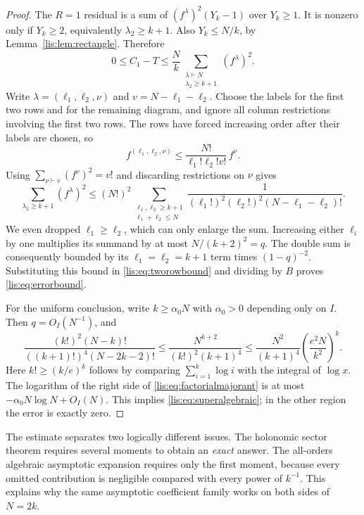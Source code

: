 \documentclass[11pt,letterpaper]{article}
\numberwithin{equation}{section}
\theoremstyle{definition}
\begin{document}
\begin{proof}
The $R=1$ residual is a sum of $(f^\lambda)^2(Y_k-1)$ over $Y_k\ge1$.
It is nonzero only if $Y_k\ge2$, equivalently $\lambda_2\ge k+1$.
Also $Y_k\le N/k$, by Lemma~\ref{lis:lem:rectangle}. Therefore
\begin{equation}
 0\le C_1-T\le\frac Nk
       \sum_{\substack{\lambda\vdash N\\\lambda_2\ge k+1}}
                      (f^\lambda)^2.\label{lis:eq:tworowbound}
\end{equation}
Write $\lambda=(\ell_1,\ell_2,\nu)$ and $v=N-\ell_1-\ell_2$.
Choose the labels for the first two rows and for the remaining diagram,
and ignore all column restrictions involving the first two rows.
The rows have forced increasing order after their labels are chosen,
so
\[
 f^{(\ell_1,\ell_2,\nu)}
 \le \frac{N!}{\ell_1!\ell_2!v!}\,f^\nu.
\]
Using $\sum_{\nu\vdash v}(f^\nu)^2=v!$ and discarding restrictions on
$\nu$ gives
\begin{equation}
 \sum_{\lambda_2\ge k+1}(f^\lambda)^2
 \le (N!)^2\sum_{\substack{\ell_1,\ell_2\ge k+1\\\ell_1+\ell_2\le N}}
        \frac{1}{(\ell_1!)^2(\ell_2!)^2(N-\ell_1-\ell_2)!}.
 \label{lis:eq:doublemajorant}
\end{equation}
We even dropped $\ell_1\ge\ell_2$, which can only enlarge the sum.
Increasing either $\ell_i$ by one multiplies its summand by at most
$N/(k+2)^2=q$. The double sum is consequently bounded by its
$\ell_1=\ell_2=k+1$ term times $(1-q)^{-2}$. Substituting this bound
in \eqref{lis:eq:tworowbound} and dividing by $B$ proves
\eqref{lis:eq:errorbound}.

For the uniform conclusion, write $k\ge\alpha_0N$ with
$\alpha_0>0$ depending only on $I$. Then $q=O_I(N^{-1})$, and
\begin{equation}
 \frac{(k!)^2(N-k)!}{((k+1)!)^4(N-2k-2)!}
 \le \frac{N^{k+2}}{(k!)^2(k+1)^4}
 \le \frac{N^2}{(k+1)^4}
                 \left(\frac{e^2N}{k^2}\right)^k.
 \label{lis:eq:factorialmajorant}
\end{equation}
Here $k!\ge(k/e)^k$ follows by comparing $\sum_{i=1}^k\log i$
with the integral of $\log x$. The logarithm of the right side of
\eqref{lis:eq:factorialmajorant} is at most
$-\alpha_0N\log N+O_I(N)$. This implies
\eqref{lis:eq:superalgebraic}; in the other region the error is exactly zero.
\end{proof}

The estimate separates two logically different issues. The holonomic
sector theorem requires several moments to obtain an \emph{exact}
answer. The all-orders algebraic asymptotic expansion requires only the
first moment, because every omitted contribution is negligible compared
with every power of $k^{-1}$. This explains why the same asymptotic
coefficient family works on both sides of $N=2k$.
\end{document}
